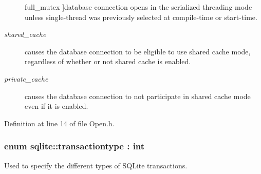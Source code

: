\begin{Desc}
\begin{description}
{\hypertarget{a00038_ac886eded97b0430b2ab92e2d08fcf938addc995071d9f139c13354c2839603fac}{full\-\_\-mutex}\label{a00038_ac886eded97b0430b2ab92e2d08fcf938addc995071d9f139c13354c2839603fac}
}]database connection opens in the serialized threading mode unless single-\/thread was previously selected at compile-\/time or start-\/time. \item[{\em 
\hypertarget{a00038_ac886eded97b0430b2ab92e2d08fcf938a799bb323b5a99b0e122ba5aec784d314}{shared\-\_\-cache}\label{a00038_ac886eded97b0430b2ab92e2d08fcf938a799bb323b5a99b0e122ba5aec784d314}
}]causes the database connection to be eligible to use shared cache mode, regardless of whether or not shared cache is enabled. \item[{\em 
\hypertarget{a00038_ac886eded97b0430b2ab92e2d08fcf938a56ffbad7684376d679b1f0dcf37d8bf7}{private\-\_\-cache}\label{a00038_ac886eded97b0430b2ab92e2d08fcf938a56ffbad7684376d679b1f0dcf37d8bf7}
}]causes the database connection to not participate in shared cache mode even if it is enabled. \end{description}
\end{Desc}


Definition at line 14 of file Open.\-h.

\hypertarget{a00038_a6b830ddde90f9bf8b2b59b395a66ceb8}{
\subsubsection[{transactiontype}]{\setlength{\rightskip}{0pt plus 5cm}enum {\bf sqlite\-::transactiontype} \-: int\hspace{0.3cm}{\ttfamily [strong]}}}\label{a00038_a6b830ddde90f9bf8b2b59b395a66ceb8}


Used to specify the different types of S\-Q\-Lite transactions. 

